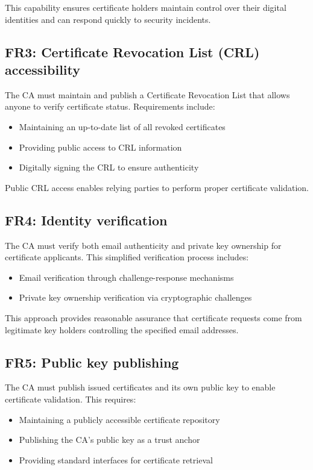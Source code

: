 This capability ensures certificate holders maintain control over their 
digital identities and can respond quickly to security incidents.

\subsection{FR3: Certificate Revocation List (CRL) accessibility}

The CA must maintain and publish a Certificate Revocation List that allows 
anyone to verify certificate status. Requirements include:

\begin{itemize}
    \item Maintaining an up-to-date list of all revoked certificates
    \item Providing public access to CRL information
    \item Digitally signing the CRL to ensure authenticity
\end{itemize}

Public CRL access enables relying parties to perform proper certificate validation.

\subsection{FR4: Identity verification}

The CA must verify both email authenticity and private key ownership for 
certificate applicants. This simplified verification process includes:

\begin{itemize}
    \item Email verification through challenge-response mechanisms
    \item Private key ownership verification via cryptographic challenges
\end{itemize}

This approach provides reasonable assurance that certificate requests come 
from legitimate key holders controlling the specified email addresses.

\subsection{FR5: Public key publishing}

The CA must publish issued certificates and its own public key to enable 
certificate validation. This requires:

\begin{itemize}
    \item Maintaining a publicly accessible certificate repository
    \item Publishing the CA's public key as a trust anchor
    \item Providing standard interfaces for certificate retrieval
\end{itemize}

